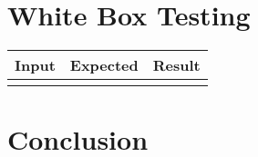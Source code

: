 \documentclass{article}
\begin{document}
         
    \section{White Box Testing}
   	   \begin{tabular}{|c|c|c|}
   	   		\hline
   	   		Input & Expected & Result\\
   	   		\hline
   	   		&&\\
   	   		\hline
   	   \end{tabular}
    \section{Conclusion}
     
\end{document}
